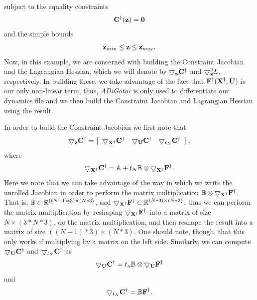 \documentclass[10pt,pdftex]{article}
\begin{document}
subject to the equality constraints
\begin{equation}
\mathbf{C}^{\dag}(\mathbf{z}) = \bf0
\end{equation}
and the simple bounds
\begin{equation}
\mathbf{z}_{min} \leq \mathbf{z} \leq \mathbf{z}_{max}.
\end{equation}
Now, in this example, we are concerned with building the Constraint Jacobian and the Lagrangian Hessian, which we will denote by $\bigtriangledown _{\mathbf{z}} \mathbf{C}^{\dag}$ and $\bigtriangledown^2 _{\mathbf{z}} L$, respectively. In building these, we take advantage of the fact that $\mathbf{F}^{\dag}(\mathbf{X}^\dag,\mathbf{U})$ is our only non-linear term, thus, \emph{ADiGator} is only used to differentiate our dynamics file and we then build the Constraint Jacobian and Lagrangian Hessian using the result.

In order to build the Constraint Jacobian we first note that
\begin{equation}
\bigtriangledown _{\mathbf{z}}\mathbf{C}^{\dag} = \left[
\begin{array}{ccc}
\bigtriangledown_{\mathbf{X}^{\dag}} \mathbf{C}^{\dag} & \bigtriangledown_{\mathbf{U}} \mathbf{C}^{\dag} & \bigtriangledown_{t_N} \mathbf{C}^{\dag} 
\end{array}
\right],
\end{equation}
where
\begin{equation}
\bigtriangledown_{\mathbf{X}^{\dag}} \mathbf{C}^{\dag} = \mathbb{A} + t_N \mathbb{B}\otimes \bigtriangledown_{\mathbf{X}^{\dag}} \mathbf{F}^{\dag}.
\end{equation}
Here we note that we can take advantage of the way in which we write the unrolled Jacobian in order to perform the matrix multiplication $\mathbb{B}\otimes \bigtriangledown_{\mathbf{X}^{\dag}} \mathbf{F}^{\dag}$. That is, $\mathbb{B} \in \mathbb{R}^{((N-1)*3) \times (N*3)}$, and $\bigtriangledown_{\mathbf{X}^{\dag}} \mathbf{F}^{\dag} \in \mathbb{R}^{(N*3) \times (N*3)}$, thus we can perform the matrix multiplication by reshaping $\bigtriangledown_{\mathbf{X}^{\dag}} \mathbf{F}^{\dag}$ into a matrix of size $N \times (3*N*3)$, do the matrix multiplication, and then reshape the result into a matrix of size $((N-1)*3) \times (N*3)$. One should note, though, that this only works if multiplying by a matrix on the left side. Similarly, we can compute $\bigtriangledown_{\mathbf{U}} \mathbf{C}^{\dag}$ and $\bigtriangledown_{t_N} \mathbf{C}^{\dag}$ as
\begin{equation}
\bigtriangledown_{\mathbf{U}} \mathbf{C}^{\dag} = t_n \mathbb{B}\otimes \bigtriangledown_{\mathbf{U}} \mathbf{F}^{\dag}
\end{equation}
and
\begin{equation}
\bigtriangledown_{t_N} \mathbf{C}^{\dag}  = \mathbb{B} \mathbf{F}^{\dag}.
\end{equation}
\end{document}
